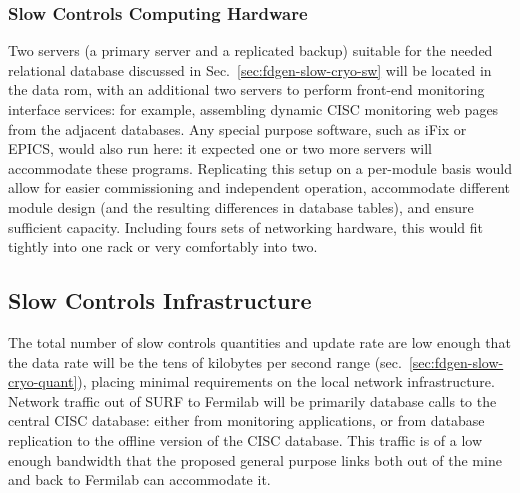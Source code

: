 \subsubsection{Slow Controls Computing Hardware}
\label{sec:fdgen-slow-cryo-slow-compute}

Two servers (a primary server and a replicated backup) suitable for the needed relational database discussed
in Sec.~\ref{sec:fdgen-slow-cryo-sw} will be located in the  data
rom, with an additional
two servers to perform front-end monitoring interface services: for
example, assembling dynamic CISC monitoring web pages from the adjacent
databases.  Any special purpose software, such as iFix or EPICS, would
also run here: it expected one or two more servers will accommodate
these programs.
Replicating this setup on a per-module basis would allow for easier
commissioning and independent operation, accommodate different module
design (and the resulting differences in database tables), and ensure
sufficient capacity.  Including fours sets of networking hardware, this
would fit tightly into one rack or very comfortably into two.





\subsection{Slow Controls Infrastructure}
\label{sec:fdgen-slow-cryo-slow-infra}

The total number of slow controls quantities and update rate are low enough
that the data rate will be the tens of kilobytes per second range
(sec.~\ref{sec:fdgen-slow-cryo-quant}), placing minimal requirements
on the local network infrastructure.
Network traffic out of SURF to Fermilab will be primarily database calls
to the central CISC database: either from monitoring applications, or from
database replication to the offline version of the CISC database.  This
traffic is of a low enough bandwidth that the proposed general purpose
links both out of the mine and back to Fermilab can accommodate it.

